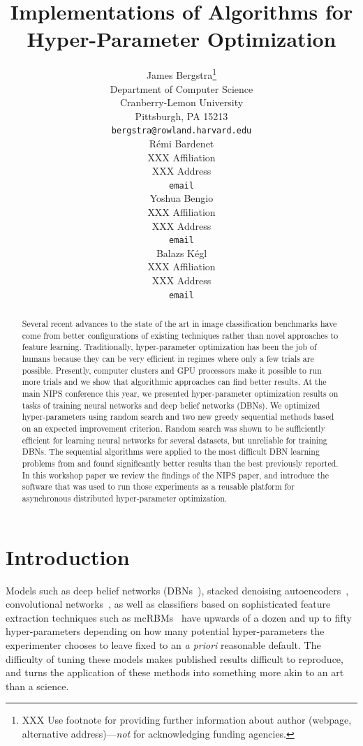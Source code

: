 \documentclass{article}
\title{Implementations of Algorithms for Hyper-Parameter Optimization}
\author{
James Bergstra\thanks{XXX Use footnote for providing further information
about author (webpage, alternative address)---\emph{not} for acknowledging
funding agencies.} \\
Department of Computer Science\\
Cranberry-Lemon University\\
Pittsburgh, PA 15213 \\
\texttt{bergstra@rowland.harvard.edu} \\
\And
R{\'e}mi Bardenet \\
XXX Affiliation \\
XXX Address \\
\texttt{email} \\
\AND
Yoshua Bengio \\
XXX Affiliation \\
XXX Address \\
\texttt{email} \\
\And
Balazs K{\'e}gl \\
XXX Affiliation \\
XXX Address \\
\texttt{email}
}
\newcommand{\vs}[1]{\vspace*{-#1mm}}
\newcommand{\Bs}{\vs{2}}
\newcommand{\as}{\vs{1}}
\begin{document}
\maketitle
\begin{abstract}
\vs{2}
    Several recent advances to the state of the art in image classification benchmarks have come
    from better configurations of existing techniques rather than novel approaches to
    feature learning.
    Traditionally,
    hyper-parameter optimization has been the job of humans because they can be very efficient in regimes where only a few trials are possible.
    Presently, computer clusters and GPU processors make it possible to run more trials
    and we show that algorithmic approaches can find better results.
    At the main NIPS conference this year, we presented hyper-parameter optimization results on tasks of training neural networks and deep belief networks (DBNs).
    We optimized hyper-parameters using random search
    and two new greedy sequential methods based on an expected improvement criterion.
    Random search was shown to be sufficiently efficient for learning neural networks for several datasets,
    but unreliable for training DBNs.
    The sequential algorithms were applied to the most difficult DBN learning problems from\cite{Larochelle+etal:2007}
    and found significantly better results than the best previously reported.
    In this workshop paper we review the findings of the NIPS paper, and
    introduce the software that was used to run those experiments as a reusable platform for
    asynchronous distributed hyper-parameter optimization.
\vs{3}
\end{abstract}

\Bs
\section{Introduction}
\as

Models such as deep belief networks (DBNs~\citep{hinton+osindero+teh:2006}),
stacked denoising autoencoders~\citep{vincent+larochelle+lajoie+bengio+manzagol:2010},
convolutional networks~\citep{lecun+bottou+bengio+haffner:1998},
as well as classifiers based on sophisticated feature extraction techniques such as
mcRBMs~\citep{ranzato+hinton:2010}
have upwards of a dozen and up to fifty hyper-parameters depending on how many
potential hyper-parameters the experimenter chooses to leave fixed to an {\it a priori} reasonable default.
The difficulty of tuning these models makes published results difficult to
reproduce, and turns the application of these methods into something more akin
to an art than a science.
\end{document}
